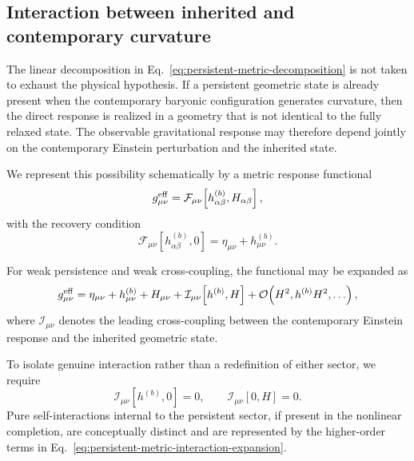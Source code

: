 \subsection{Interaction between inherited and contemporary curvature}
\label{subsec:persistent-state-interaction}

The linear decomposition in
Eq.~\eqref{eq:persistent-metric-decomposition} is not taken to exhaust the
physical hypothesis. If a persistent geometric state is already present when
the contemporary baryonic configuration generates curvature, then the direct
response is realized in a geometry that is not identical to the fully relaxed
state. The observable gravitational response may therefore depend jointly on
the contemporary Einstein perturbation and the inherited state.

We represent this possibility schematically by a metric response functional
\begin{equation}
    g_{\mu\nu}^{\rm eff}
    =
    \mathcal{F}_{\mu\nu}
    \!\left[
        h_{\alpha\beta}^{(b)},
        H_{\alpha\beta}
    \right],
    \label{eq:persistent-effective-metric-functional}
\end{equation}
with the recovery condition
\begin{equation}
    \mathcal{F}_{\mu\nu}
    \!\left[
        h_{\alpha\beta}^{(b)},0
    \right]
    =
    \eta_{\mu\nu}
    +
    h_{\mu\nu}^{(b)}.
    \label{eq:persistent-functional-gr-recovery}
\end{equation}

For weak persistence and weak cross-coupling, the functional may be expanded as
\begin{equation}
    g_{\mu\nu}^{\rm eff}
    =
    \eta_{\mu\nu}
    +
    h_{\mu\nu}^{(b)}
    +
    H_{\mu\nu}
    +
    \mathcal{I}_{\mu\nu}
    \!\left[
        h^{(b)},H
    \right]
    +
    \mathcal{O}\!\left(H^2,h^{(b)}H^2,\ldots\right),
    \label{eq:persistent-metric-interaction-expansion}
\end{equation}
where $\mathcal{I}_{\mu\nu}$ denotes the leading cross-coupling between the
contemporary Einstein response and the inherited geometric state.

To isolate genuine interaction rather than a redefinition of either sector, we
require
\begin{equation}
    \mathcal{I}_{\mu\nu}[h^{(b)},0]=0,
    \qquad
    \mathcal{I}_{\mu\nu}[0,H]=0.
    \label{eq:persistent-interaction-vanishing}
\end{equation}
Pure self-interactions internal to the persistent sector, if present in the
nonlinear completion, are conceptually distinct and are represented by the
higher-order terms in
Eq.~\eqref{eq:persistent-metric-interaction-expansion}.

